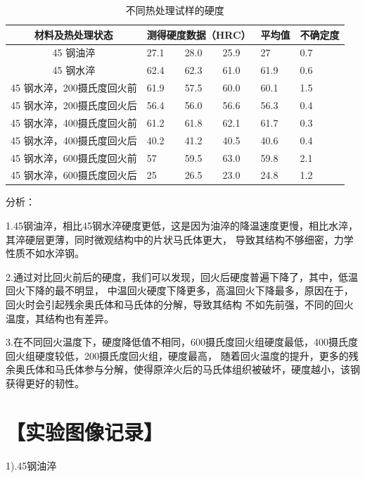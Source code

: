 \documentclass[a4paper,utf8]{article}
\begin{document}
\begin{table}[!ht]\centering
    \caption{不同热处理试样的硬度}
    \extrarowheight=11pt
    \begin{tabularx}{\textwidth}{|c|X|X|X|X|X|}\hline
        材料及热处理状态 & \multicolumn{3}{c|}{测得硬度数据（HRC）} & \hfil 平均值 \hfil &不确定度 \\[10pt] \hline
        45 钢油淬 & 27.1 & 28.0 & 25.9 & 27 &0.7\\[10pt] \hline
        45 钢水淬 & 62.4 & 62.3 & 61.0 & 61.9 &0.6\\[10pt] \hline
        45 钢水淬，200摄氏度回火前 & 61.9 & 57.5 &60.0  & 60.1 &1.5\\[10pt] \hline
        45 钢水淬，200摄氏度回火后 & 56.4 & 56.0 &56.6  & 56.3 &0.4\\[10pt] \hline
        45 钢水淬，400摄氏度回火前 & 61.2 & 61.8 &62.1  &61.7 &0.3\\[10pt] \hline
        45 钢水淬，400摄氏度回火后 & 40.2 & 41.2 &40.5  &40.6 &0.4\\[10pt] \hline
        45 钢水淬，600摄氏度回火前 & 57 & 59.5 &63.0  & 59.8 &2.1\\[10pt] \hline
        45 钢水淬，600摄氏度回火后 & 25 & 26.5 &23.0  & 24.8 &1.2\\[10pt] \hline
    \end{tabularx}
\end{table}

分析：

1.45钢油淬，相比45钢水淬硬度更低，这是因为油淬的降温速度更慢，相比水淬，其淬硬层更薄，同时微观结构中的片状马氏体更大，
导致其结构不够细密，力学性质不如水淬钢。

2.通过对比回火前后的硬度，我们可以发现，回火后硬度普遍下降了，其中，低温回火下降的最不明显，
中温回火硬度下降更多，高温回火下降最多，原因在于，回火时会引起残余奥氏体和马氏体的分解，导致其结构
不如先前强，不同的回火温度，其结构也有差异。

3.在不同回火温度下，硬度降低值不相同，600摄氏度回火组硬度最低，400摄氏度回火组硬度较低，200摄氏度回火组，硬度最高，
随着回火温度的提升，更多的残余奥氏体和马氏体参与分解，使得原淬火后的马氏体组织被破坏，硬度越小，该钢
获得更好的韧性。
\newpage
\section*{【实验图像记录】}

1).45钢油淬
\end{document}
